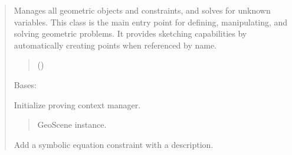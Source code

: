 \documentclass[letterpaper,10pt,english]{sphinxmanual}
\begin{document}
\begin{quote}
\begin{fulllineitems}
\sphinxAtStartPar
Manages all geometric objects and constraints, and solves for unknown variables.
This class is the main entry point for defining, manipulating, and solving
geometric problems. It provides sketching capabilities by automatically creating
points when referenced by name.
\begin{quote}\begin{description}
\sphinxAtStartPar
{} (\sphinxstyleliteralemphasis{\sphinxupquote{ | }})

\end{description}\end{quote}

\begin{fulllineitems}
\label{\detokenize{pygeox:pygeox.geoscene.GeoScene.ProvingContext}}
\pysigstartsignatures
\pysiglinewithargsret
{}
{}
{}
\pysigstopsignatures
\sphinxAtStartPar
Bases: 

\sphinxAtStartPar
Initialize proving context manager.
\begin{quote}\begin{description}
\sphinxAtStartPar
{} \textendash{} GeoScene instance.

\end{description}\end{quote}

\end{fulllineitems}


\begin{fulllineitems}
\label{\detokenize{pygeox:pygeox.geoscene.GeoScene.add_constraint}}
\pysigstartsignatures
\pysiglinewithargsret
{}
{\sphinxparamcomma {}}
{}
\pysigstopsignatures
\sphinxAtStartPar
Add a symbolic equation constraint with a description.


\end{fulllineitems}
\end{fulllineitems}
\end{quote}
\end{document}
